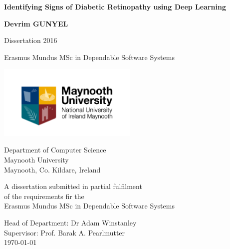 \documentclass[a4paper,12pt]{report}
\begin{document}
\begin{titlepage}
    \begin{center}
        \vspace*{1cm}
        
        \LARGE
        \textbf{Identifying Signs of Diabetic Retinopathy using Deep Learning}
        
        \vspace{0.5cm}
        \LARGE
        \textbf{Devrim GUNYEL}
        
        Dissertation 2016
        
        \normalsize
        Erasmus Mundus MSc in Dependable Software Systems
        
        \vspace{0.5cm}
        
        \includegraphics[width=0.5\textwidth]{Figures/university}
        
        \normalsize
        Department of Computer Science\\
        Maynooth University\\
        Maynooth, Co. Kildare, Ireland\\
        
        \vspace{0.5cm}
        
        \small
        A dissertation submitted in partial fulfilment\\
        of the requirements fir the \\
        Erasmus Mundus MSc in Dependable Software Systems
        
        \large
        Head of Department: Dr Adam Winstanley\\
        Supervisor: Prof. Barak A. Pearlmutter\\
        \today
        
        
    \end{center}
\end{titlepage}






\end{document}
